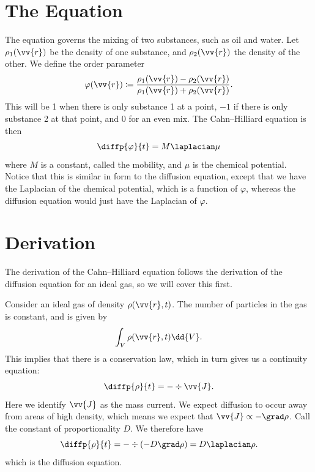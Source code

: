 \documentclass[fleqn]{NotesClass}
\begin{document}
    \section{The Equation}
    The  equation governs the mixing of two substances, such as oil and water.
    Let \(\rho_{1}(\vv{r})\) be the density of one substance, and \(\rho_2(\vv{r})\) the density of the other.
    We define the order parameter
    \begin{equation}
        \varphi(\vv{r}) \coloneqq \frac{\rho_1(\vv{r}) - \rho_2(\vv{r})}{\rho_1(\vv{r}) + \rho_2(\vv{r})}.
    \end{equation}
    This will be 1 when there is only substance 1 at a point, \(-1\) if there is only substance 2 at that point, and 0 for an even mix.
    The Cahn--Hilliard equation is then
    \begin{equation}
        \diffp{\varphi}{t} = M\laplacian\mu
    \end{equation}
    where \(M\) is a constant, called the mobility, and \(\mu\) is the chemical potential.
    Notice that this is similar in form to the diffusion equation, except that we have the Laplacian of the chemical potential, which is a function of \(\varphi\), whereas the diffusion equation would just have the Laplacian of \(\varphi\).
    
    \section{Derivation}
    The derivation of the Cahn--Hilliard equation follows the derivation of the diffusion equation for an ideal gas, so we will cover this first.
    
    Consider an ideal gas of density \(\rho(\vv{r}, t)\).
    The number of particles in the gas is constant, and is given by
    \begin{equation}
        \int_V \rho(\vv{r}, t) \dd{V}.
    \end{equation}
    This implies that there is a conservation law, which in turn gives us a continuity equation:
    \begin{equation}
        \diffp{\rho}{t} = -\div\vv{J}.
    \end{equation}
    Here we identify \(\vv{J}\) as the mass current.
    We expect diffusion to occur away from areas of high density, which means we expect that \(\vv{J} \propto -\grad \rho\).
    Call the constant of proportionality \(D\).
    We therefore have
    \begin{equation}
        \diffp{\rho}{t} = -\div(-D\grad \rho) = D \laplacian \rho.
    \end{equation}
    which is the diffusion equation.
    
\end{document}
